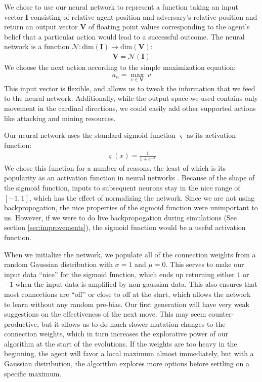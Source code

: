 \documentclass{article}
\begin{document}
We chose to use our neural network to represent a function taking an input
vector $\bm{I}$ consisting of relative agent position and adversary's relative
position and return an output vector $\bm{V}$ of floating point values
corresponding to the agent's belief that a particular action would lead to a
successful outcome. The neural network is a function
$\mathcal{N}:\text{dim}(\bm{I})\rightarrow\text{dim}(\bm{V})$:
\begin{align}
  \bm{V} = \mathcal{N}(\bm{I})
\end{align}
We choose the next action according to the simple maximization equation:
\begin{align}
  a_n = \max_{v \in \bm{V}} \: v
\end{align}
This input vector is flexible, and allows us to tweak the information that we
feed to the neural network. Additionally, while the output space we used
contains only movement in the cardinal directions, we could easily add other
supported actions like attacking and mining resources.

Our neural network uses the standard sigmoid function $\varsigma$ as its
activation function:
\begin{align*}
  \varsigma(x) = \frac{1}{1 + e^{-x}}
\end{align*}
We chose this function for a number of reasons, the least of which is its
popularity as an activation function in neural networks \cite{russell}. Because
of the shape of the sigmoid function, inputs to subsequent neurons stay in the
nice range of $[-1, 1]$, which has the effect of normalizing the network. Since
we are not using backpropogation, the nice properties of the sigmoid function
were unimportant to us. However, if we were to do live backpropogation during
simulations (See section \ref{sec:improvements}), the sigmoid function would be
a useful activation function.

When we initialize the network, we populate all of the connection weights from a
random Gaussian distribution with $\sigma = 1$ and $\mu = 0$. This serves to
make our input data ``nice'' for the sigmoid function, which ends up returning
either $1$ or $-1$ when the input data is amplified by non-gaussian data. This
also ensures that most connections are ``off'' or close to off at the start,
which allows the network to learn without any random pre-bias. Our first
generation will have very weak suggestions on the effectiveness of the next
move. This may seem counter-productive, but it allows us to do much slower
mutation changes to the connection weights, which in turn increases the
explorative power of our algorithm at the start of the evolutions. If the
weights are too heavy in the beginning, the agent will favor a local maximum
almost immediately, but with a Gaussian distribution, the algorithm explores
more options before settling on a specific maximum.
\end{document}
